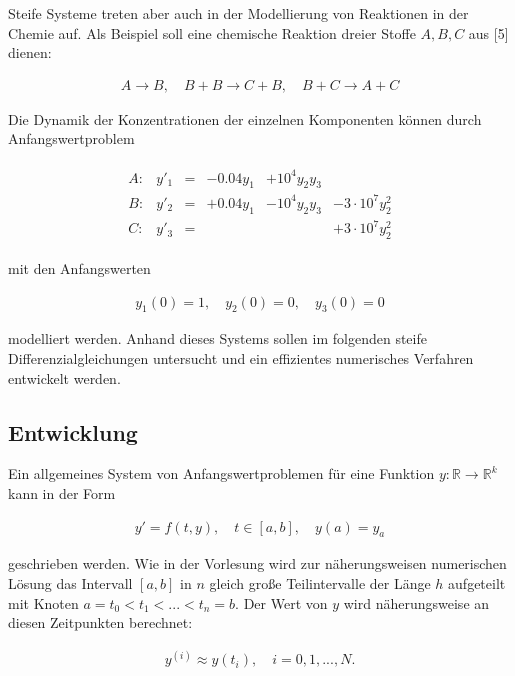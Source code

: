 \documentclass[
	pagesize,
	fontsize=12pt,
	paper=a4,
	oneside,
   reqno
]{scrartcl}
\begin{document}
Steife Systeme treten aber auch in der Modellierung von Reaktionen in der Chemie auf. Als Beispiel soll eine chemische Reaktion dreier Stoffe $A, B, C$ aus [5] dienen:

\begin{align*}
   A \rightarrow B, \quad B +B \rightarrow C + B, \quad B + C \rightarrow A + C
\end{align*}

Die Dynamik der Konzentrationen der einzelnen Komponenten können durch Anfangswertproblem

\begin{align}
   \begin{matrix*}
      A: & y'_1 & = & -0.04y_1   & +10^4y_2y_3                       \\
      B: & y'_2 & = & +0.04y_1   & -10^4y_2y_3  & -3 \cdot 10^7y_2^2 \\
      C: & y'_3 & = &            &              & +3 \cdot 10^7y_2^2
   \end{matrix*}
\end{align}

mit den Anfangswerten

\begin{align}
   y_1(0) = 1, \quad y_2(0) = 0, \quad y_3(0) = 0
\end{align}

modelliert werden. Anhand dieses Systems sollen im folgenden steife Differenzialgleichungen untersucht und ein effizientes numerisches Verfahren entwickelt werden.

\subsection{Entwicklung}

Ein allgemeines System von Anfangswertproblemen für eine Funktion $y : \mathbb{R} \to \mathbb{R} ^k$ kann in der Form

\begin{align}
   \label{eq:eq11}
   y' = f(t,y), \quad t \in [a,b], \quad y(a) = y_a
\end{align}

geschrieben werden. Wie in der Vorlesung wird zur näherungsweisen numerischen Lösung das Intervall $[a,b]$ in $n$ gleich große Teilintervalle der Länge $h$ aufgeteilt mit Knoten $a = t_0 < t_1 < ... < t_n = b$. Der Wert von $y$ wird näherungsweise an diesen Zeitpunkten berechnet:

\begin{align*}
   y^{(i)} \approx y(t_i), \quad i = 0, 1, ..., N.
\end{align*}
\end{document}

